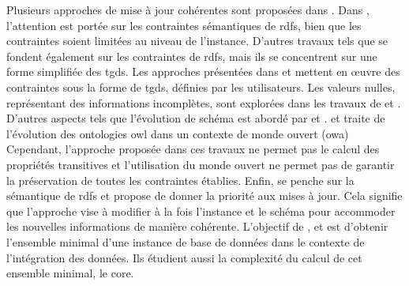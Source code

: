 Plusieurs approches de mise à jour cohérentes sont proposées dans \cite{scheweTheoryConsistencyEnforcement1999,linkArithmeticTheoryConsistency2002,pichlerComplexityEvaluatingTuple2011,flourisFormalFoundationsRDF2013,goasdoueEfficientQueryAnswering2013,mahfoudhAdaptationOntologiesAvec2015,halfedferrariRDFUpdatesConstraints2017,chabinUsingGraphGrammar2019,chabinConsistentUpdatingDatabases2020}.
Dans \cite{goasdoueEfficientQueryAnswering2013}, l'attention est portée sur les contraintes sémantiques de \gls{rdfs}, bien que les contraintes soient limitées au niveau de l'instance.
D'autres travaux tels que \cite{halfedferrariRDFUpdatesConstraints2017} se fondent également sur les contraintes de \gls{rdfs}, mais ils se concentrent sur une forme simplifiée des \glspl{tgd}.
Les approches présentées dans \cite{flourisFormalFoundationsRDF2013} et \cite{chabinUsingGraphGrammar2019} mettent en œuvre des contraintes sous la forme de \glspl{tgd}, définies par les utilisateurs.
Les valeurs nulles, représentant des informations incomplètes, sont explorées dans les travaux de \cite{halfedferrariRDFUpdatesConstraints2017} et \cite{chabinUsingGraphGrammar2019}.
D'autres aspects tels que l'évolution de schéma est abordé par \cite{flourisFormalFoundationsRDF2013} et \cite{goasdoueEfficientQueryAnswering2013}.
\cite{mahfoudhAdaptationOntologiesAvec2015} et \cite{mahfoudhAlgebraicGraphTransformations2015} traite de l'évolution des ontologies \gls{owl} dans un contexte de monde ouvert (\acs{owa})
Cependant, l'approche proposée dans ces travaux ne permet pas le calcul des propriétés transitives et l'utilisation du monde ouvert ne permet pas de garantir la préservation de toutes les contraintes établies.
Enfin, \cite{chabinUsingGraphGrammar2019} se penche sur la sémantique de \gls{rdfs} et propose de donner la priorité aux mises à jour.
Cela signifie que l'approche vise à modifier à la fois l'instance et le schéma pour accommoder les nouvelles informations de manière cohérente.
L'objectif de \cite{faginDataExchangeGetting2005}, \cite{gottlobComputingCoresData2005} et \cite{pichlerComplexityEvaluatingTuple2011} est d'obtenir l'ensemble minimal d'une instance de base de données dans le contexte de l'intégration des données.
Ils étudient aussi la complexité du calcul de cet ensemble minimal, le \gls{core}.


